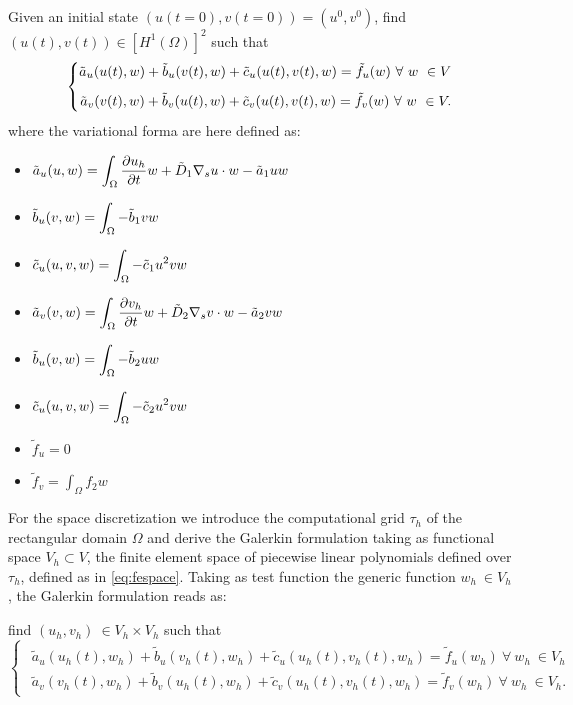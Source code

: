 Given an initial state $\left(u(t = 0), v(t = 0)\right) = (u^0, v^0)$, find $(u(t), v(t)) \in \left[H^1\left(\Omega\right)\right]^2$ such that
\begin{equation}
\left\lbrace
\begin{matrix}
\begin{aligned}
  \Tilde{a}_u(u(t), w) + \Tilde{b}_u(v(t), w) + \Tilde{c}_{u}(u(t), v(t), w) = \tilde{f}_u(w) \ \forall \ w \ \in V \\[6pt]
  \Tilde{a}_v(v(t), w) + \Tilde{b}_v(u(t), w) + \Tilde{c}_{v}(u(t), v(t), w) = \tilde{f}_v(w) \ \forall \ w \ \in V.
\end{aligned}
\end{matrix}
\right.
\end{equation}
where the variational forma are here defined as:
\begin{itemize}
    \item $\Tilde{a}_u(u, w) = \displaystyle \int_{\Omega} \displaystyle \frac{\partial u_h}{\partial t} w + \Tilde{D}_1 \nabla_s u \cdot w - \Tilde{a}_1 u w $
    \item $\Tilde{b}_u(v, w) = \displaystyle \int_{\Omega} \displaystyle - \Tilde{b}_1 v w$
    \item $\Tilde{c}_{u}(u, v, w) = \displaystyle \int_{\Omega} \displaystyle - \Tilde{c}_1 u^2 v w$
    \item $\Tilde{a}_v(v, w) = \displaystyle \int_{\Omega} \displaystyle \frac{\partial v_h}{\partial t} w + \Tilde{D}_2 \nabla_s v \cdot w - \Tilde{a}_2 v w $
    \item $\tilde{b}_u(v, w) = \displaystyle \int_{\Omega} \displaystyle - \Tilde{b}_2 u w$
    \item $\tilde{c}_{u}(u, v, w) = \displaystyle \int_{\Omega} \displaystyle - \Tilde{c}_2 u^2 v w$
    \item $\tilde{f}_u = 0$
    \item $\tilde{f}_v = \displaystyle \int_{\Omega} \displaystyle f_2 w$
\end{itemize}

For the space discretization we introduce the computational grid $\tau_h$ of the rectangular domain $\Omega$ and derive the Galerkin formulation taking as functional space $V_h \subset V$, the finite element space of piecewise linear polynomials defined over $\tau_h$, defined as in \eqref{eq:fespace}.
Taking as test function the generic function $w_h \ \in V_h$, the Galerkin formulation reads as:

find $(u_h, v_h) \ \in V_h \times V_h$ such that
\begin{equation}\label{eq:Galerkin}
\left\lbrace
\begin{matrix}
\begin{aligned}
  \tilde{a}_u(u_h(t), w_h) + \tilde{b}_u(v_h(t), w_h) + \tilde{c}_{u}(u_h(t), v_h(t), w_h) = \tilde{f}_u(w_h) \ \forall \ w_h \ \in V_h \\
  \tilde{a}_v(v_h(t), w_h) + \tilde{b}_v(u_h(t), w_h) + \tilde{c}_{v}(u_h(t), v_h(t), w_h) = \tilde{f}_v(w_h) \ \forall \ w_h \ \in V_h.
\end{aligned}
\end{matrix}
\right.
\end{equation}

